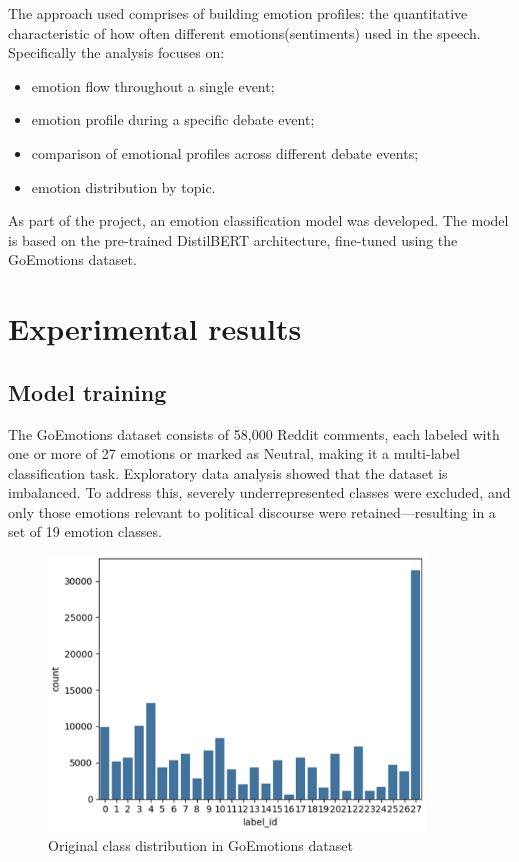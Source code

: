\documentclass[pdflatex,sn-mathphys-num]{sn-jnl}%
\begin{document}
The approach used comprises of building emotion profiles: the quantitative characteristic of how often different emotions(sentiments) used in the speech.
Specifically the analysis focuses on:
\begin{itemize}

	\item emotion flow throughout a single event;
	\item emotion profile during a specific debate event;
	\item comparison of emotional profiles across different debate events;
	\item emotion distribution by topic.
\end{itemize}

As part of the project, an emotion classification model was developed. The model is based on the pre-trained DistilBERT architecture, fine-tuned using the GoEmotions dataset. 

\section{Experimental results}\label{sec3}
\subsection{Model training}

The GoEmotions dataset consists of 58,000 Reddit comments, each labeled with one or more of 27 emotions or marked as Neutral, making it a multi-label classification task.
Exploratory data analysis showed that the dataset is imbalanced. To address this, severely underrepresented classes were excluded, and only those emotions relevant to political discourse were retained—resulting in a set of 19 emotion classes.
\begin{figure}[h]
	\centering
	\includegraphics[width=10cm]{f1-label_distribution.png}
	\caption{Original class distribution in GoEmotions dataset}
\end{figure}
\end{document}
